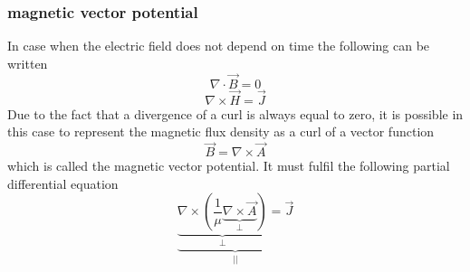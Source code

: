 \subsubsection{magnetic vector potential}
In case when the electric field does not depend on time the following can be written
\begin{equation*}
	\nabla \cdot \vec{B} = 0
\end{equation*}
\begin{equation*}
	\nabla \times \vec{H} = \vec{J}
\end{equation*}
Due to the fact that a divergence of a curl is always equal to zero, it is possible in this case to represent the magnetic flux density as a curl of a vector function 
\begin{equation*}
	\vec{B} = \nabla \times \vec{A}
\end{equation*}
which is called the magnetic vector potential. It must fulfil the following partial differential equation
\begin{equation*}
	\underbrace{\underbrace{\nabla \times \left(\frac{1}{\mu}\underbrace{\nabla \times \vec{A}}_{\bot}\right)}_{\bot} = \vec{J}}_{||}
\end{equation*}